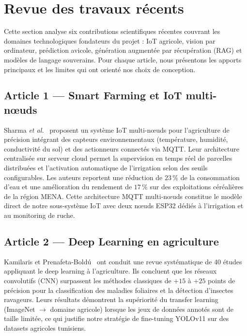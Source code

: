 \section{Revue des travaux récents}

Cette section analyse six contributions scientifiques récentes couvrant les domaines
technologiques fondateurs du projet : IoT agricole, vision par ordinateur,
prédiction avicole, génération augmentée par récupération (RAG) et modèles de
langage souverains. Pour chaque article, nous présentons les apports principaux
et les limites qui ont orienté nos choix de conception.

\subsection*{Article 1 --- Smart Farming et IoT multi-nœuds}

Sharma \textit{et al.}~\cite{sharma2024smart} proposent un système IoT multi-nœuds
pour l'agriculture de précision intégrant des capteurs environnementaux (température,
humidité, conductivité du sol) et des actionneurs connectés via MQTT.
Leur architecture centralisée sur serveur cloud permet la supervision en temps réel
de parcelles distribuées et l'activation automatique de l'irrigation selon des
seuils configurables. Les auteurs reportent une réduction de $23\,\%$ de la
consommation d'eau et une amélioration du rendement de $17\,\%$ sur des exploitations
céréalières de la région MENA.
Cette architecture MQTT multi-nœuds constitue le modèle direct de notre sous-système
IoT avec deux nœuds ESP32 dédiés à l'irrigation et au monitoring de ruche.

\subsection*{Article 2 --- Deep Learning en agriculture}

Kamilaris et Prenafeta-Boldú~\cite{kamilaris2018} ont conduit une revue systématique
de 40 études appliquant le deep learning à l'agriculture.
Ils concluent que les réseaux convolutifs (CNN) surpassent les méthodes classiques
de $+15$ à $+25$ points de précision pour la classification des maladies foliaires
et la détection d'insectes ravageurs.
Leurs résultats démontrent la supériorité du transfer learning (ImageNet $\rightarrow$
domaine agricole) lorsque les jeux de données annotés sont de taille limitée,
ce qui justifie notre stratégie de fine-tuning YOLOv11 sur des datasets agricoles
tunisiens.


